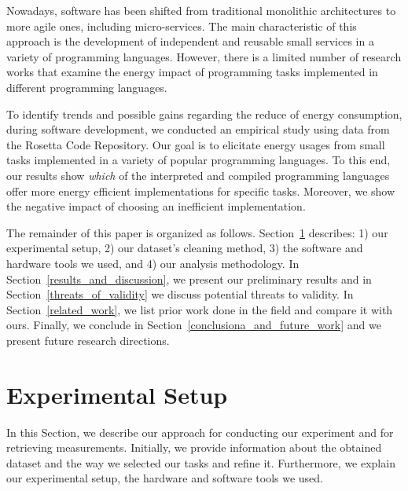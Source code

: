Nowadays, software has been shifted from traditional 
monolithic architectures to more agile ones, including micro-services. 
The main characteristic of this approach is the development of independent and 
reusable small services in a variety of programming languages.
However, there is a limited number of research works
that examine the energy impact of programming tasks implemented in different 
programming languages.


To identify trends and possible gains regarding the reduce of energy 
consumption, during software development, we conducted an empirical 
study using data from the Rosetta Code Repository.
Our goal is to elicitate energy usages from small 
tasks implemented in a variety of popular
programming languages.
To this end, our results show \textit{which} of the interpreted and 
compiled programming languages offer more energy efficient implementations 
for specific tasks. 
Moreover, we show the negative impact of choosing an inefficient implementation.


The remainder of this paper is organized as follows.
Section~\ref{experiment_setup} describes: 1) our experimental 
setup, 2) our dataset's cleaning method, 3) the software and hardware 
tools we used, and 4) our analysis methodology. 
In Section~\ref{results_and_discussion}, we present our preliminary 
results and in Section~\ref{threats_of_validity} we discuss 
potential threats to validity.
In Section~\ref{related_work}, we list prior work done in the 
field and compare it with ours.
Finally, we conclude in Section~\ref{conclusiona_and_future_work} 
and we present future research directions.

\section{Experimental Setup} \label{experiment_setup}
In this Section, we describe our approach for conducting  
our experiment and for retrieving measurements. 
Initially, we provide information about the obtained dataset 
and the way we selected our tasks and refine it. 
Furthermore, we explain our experimental setup, the hardware and 
software tools we used. 

